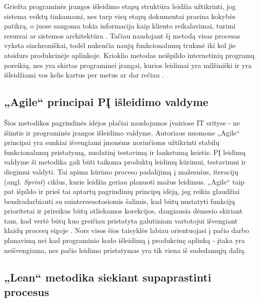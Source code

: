 \documentclass{VUMIFPSkursinis}
\begin{document}
Griežta programinės įrangos išleidimo etapų struktūra leidžia užtikrinti, jog sistema veiktų tinkamami, nes tarp visų etapų dokumentai praeina kokybės patikrą, o juose saugoma tokia informacija kaip kliento reikalavimai, turimi resursai ar sistemos architektūra \cite{SaltKetvirtas}. Tačiau naudojant šį metodą visas procesas vyksta sinchroniškai, todėl nukenčia naujų funkcionalumų trukmė iki kol jie atsidurs produkcinėje aplinkoje. Krioklio metodas neišpildo internetinių programų poreikių, nes yra skirtas programinei įrangai, kurios leidimai yra milžiniški ir yra išleidžiami vos kelis kartus per metus ar dar rečiau \cite{SaltTrecias}.

\subsection{„Agile“ principai PĮ išleidimo valdyme}

Šios metodikos pagrindinės idėjos plačiai naudojamos įvairiose IT srityse - ne išimtis ir programinės įrangos išleidimo valdyme. Autoriaus nuomone „Agile“ principai yra sunkiai išvengiami įmonėms norinčioms užtikrinti stabilų funkcionalumų pristatymą, nuolatinį testavimą ir lankstumą keistis. PĮ leidimų valdyme ši metodika gali būti taikoma produktų leidimų kūrimui, testavimui ir diegimui valdyti. Tai apima kūrimo proceso padalijimą į mažesnius, iteracijų (angl. \textit{Sprint}) ciklus, kurie leidžia geriau planuoti mažus leidimus. „Agile“ taip pat išpildo ir prieš tai aptartų pagrindinių principų idėją, jog reikia glaudžiai bendradarbiauti su suinteresuotosiomis šalimis, kad būtų nustatyti funkcijų prioritetai ir prireikus būtų atliekamos korekcijos, daugiausia dėmesio skiriant tam, kad vertė būtų kuo greičiau pristatyta galutiniam vartotojui išvengiant klaidų procesų eigoje \cite{SaltTrecias}. Nors visos šios taisyklės labiau orientuojasi į pačio darbo planavimą nei kad programinio kodo išleidimą į produkcinę aplinką - įtaka yra neišvengiama, nes pačio leidimo pristatymas yra tik viena iš sudedamųjų dalių.

\subsection{„Lean“ metodika siekiant supaprastinti procesus}
\end{document}
